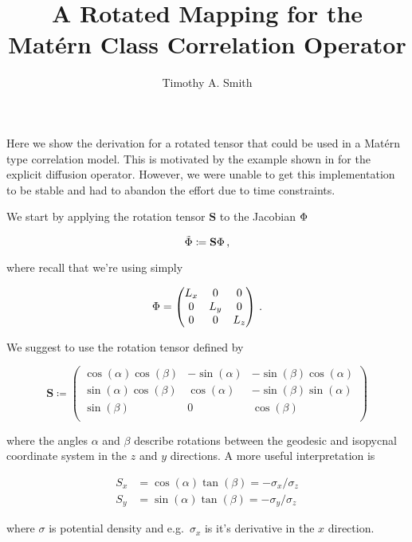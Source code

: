 \documentclass[alpha-refs]{qjrms/wiley-article}
\title{A Rotated Mapping for the Mat\'ern Class Correlation Operator
}
\author{Timothy A. Smith}
\newcommand{\ca}{\ensuremath{\cos(\alpha)}}
\newcommand{\cb}{\ensuremath{\cos(\beta)}}
\newcommand{\sia}{\ensuremath{\sin(\alpha)}}
\newcommand{\sib}{\ensuremath{\sin(\beta)}}
\newcommand{\tb}{\ensuremath{\tan(\beta)}}
\begin{document}
\maketitle

Here we show the derivation for a rotated tensor that could be used in a
Mat\'ern type correlation model.
This is motivated by the example shown in \citet{weaver_correlation_2001} for
the explicit diffusion operator.
However, we were unable to get this implementation to be stable and had to
abandon the effort due to time constraints.

We start by applying the rotation tensor $\mathbf{S}$ to the Jacobian $\Phi$
\begin{linenomath*}\begin{equation*}
    \tilde{\Phi} \coloneqq \mathbf{S} \Phi \, ,
\end{equation*}\end{linenomath*}
where recall that we're using simply
\begin{linenomath*}\begin{equation*}
    \Phi =
        \begin{pmatrix}
            L_x & 0 & 0 \\
            0 & L_y & 0 \\
            0 & 0 & L_z \\
    \end{pmatrix} \, .
\end{equation*}\end{linenomath*}
We suggest to use the rotation tensor defined by \citep{redi_oceanic_1982}
\begin{linenomath*}\begin{equation*}
    \mathbf{S} \coloneqq
        \begin{pmatrix}
            \ca \cb & - \sia & - \sib\ca \\
            \sia \cb & \ca & - \sib\sia \\
            \sib & 0 & \cb \\
        \end{pmatrix}
\end{equation*}\end{linenomath*}
where the angles $\alpha$ and $\beta$ describe rotations between the geodesic
and isopycnal coordinate system in the $z$ and $y$ directions.
A more useful interpretation is
\begin{linenomath*}\begin{equation*}
    \begin{aligned}
        S_x &= \ca\tb = -\sigma_x / \sigma_z \\
        S_y &= \sia\tb = -\sigma_y / \sigma_z
    \end{aligned}
\end{equation*}\end{linenomath*}
where $\sigma$ is potential density and e.g.\ $\sigma_x$ is it's derivative in
the $x$ direction.
\end{document}
